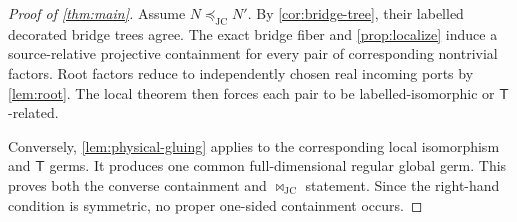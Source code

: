 \documentclass[11pt]{article}
\theoremstyle{remark}
\newcommand{\JC}{\mathrm{JC}}
\newcommand{\Tmove}{\mathsf T}
\newcommand{\preceqjc}{\preceq_{\!\JC}}
\newcommand{\bowtiejc}{\mathbin{\bowtie}_{\!\JC}}
\begin{document}
\begin{proof}[Proof of \cref{thm:main}]
Assume $N\preceqjc N'$.  By \cref{cor:bridge-tree}, their labelled decorated
bridge trees agree.  The exact bridge fiber and \cref{prop:localize} induce a
source-relative projective containment for every pair of corresponding
nontrivial factors.  Root factors reduce to independently chosen real
incoming ports by \cref{lem:root}.  The local theorem then forces each pair
to be labelled-isomorphic or $\Tmove$-related.

Conversely, \cref{lem:physical-gluing} applies to the corresponding local
isomorphism and $\Tmove$ germs.  It produces one common full-dimensional
regular global germ.  This proves both the converse containment and
$\bowtiejc$ statement.  Since the right-hand condition is symmetric, no
proper one-sided containment occurs.
\end{proof}
\end{document}
